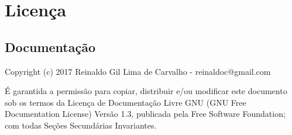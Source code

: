 \newpage \chapter{Licença}\setcounter{SteP}{1}

\section{Documentação}\setcounter{SteP}{1}

\begin{BoxVerbatim}
    Copyright (c) 2017 Reinaldo Gil Lima de Carvalho - reinaldoc@gmail.com

    É garantida a permissão para copiar, distribuir e/ou modificar este documento
sob os termos da Licença de Documentação Livre GNU (GNU Free Documentation
License) Versão 1.3, publicada pela Free Software Foundation; com todas Seções
Secundárias Invariantes.
\end{BoxVerbatim}
